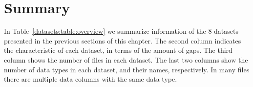 
\vspace{-15pt}
\section{Summary}
\label{datasets:summary}


In Table~\ref{datasets:table:overview} we summarize information of the 8 datasets presented in the previous sections of this chapter. The second column indicates the characteristic of each dataset, in terms of the amount of gaps. The third column shows the number of files in each dataset. The last two columns show the number of data types in each dataset, and their names, respectively. In many files there are multiple data columns with the same data type.




